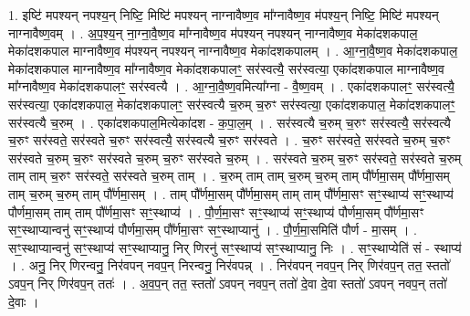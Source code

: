 \documentclass[17pt]{extarticle}
\begin{document}
1. इष्टि॑ मपश्यन् नपश्य॒न् निष्टि॒ मिष्टि॑ मपश्यन् नाग्नावैष्ण॒व मा᳚ग्नावैष्ण॒व म॑पश्य॒न् निष्टि॒ मिष्टि॑ मपश्यन् नाग्नावैष्ण॒वम् । . अ॒प॒श्य॒न् ना॒ग्ना॒वै॒ष्ण॒व मा᳚ग्नावैष्ण॒व म॑पश्यन् नपश्यन् नाग्नावैष्ण॒व मेका॑दशकपाल॒ मेका॑दशकपाल माग्नावैष्ण॒व म॑पश्यन् नपश्यन् नाग्नावैष्ण॒व मेका॑दशकपालम् । . आ॒ग्ना॒वै॒ष्ण॒व मेका॑दशकपाल॒ मेका॑दशकपाल माग्नावैष्ण॒व मा᳚ग्नावैष्ण॒व मेका॑दशकपालꣳ॒॒ सर॑स्वत्यै॒ सर॑स्वत्या॒ एका॑दशकपाल माग्नावैष्ण॒व मा᳚ग्नावैष्ण॒व मेका॑दशकपालꣳ॒॒ सर॑स्वत्यै । . आ॒ग्ना॒वै॒ष्ण॒वमित्या᳚ग्ना - वै॒ष्ण॒वम् । . एका॑दशकपालꣳ॒॒ सर॑स्वत्यै॒ सर॑स्वत्या॒ एका॑दशकपाल॒ मेका॑दशकपालꣳ॒॒ सर॑स्वत्यै च॒रुम् च॒रुꣳ सर॑स्वत्या॒ एका॑दशकपाल॒ मेका॑दशकपालꣳ॒॒ सर॑स्वत्यै च॒रुम् । . एका॑दशकपाल॒मित्येका॑दश - क॒पा॒ल॒म् । . सर॑स्वत्यै च॒रुम् च॒रुꣳ सर॑स्वत्यै॒ सर॑स्वत्यै च॒रुꣳ सर॑स्वते॒ सर॑स्वते च॒रुꣳ सर॑स्वत्यै॒ सर॑स्वत्यै च॒रुꣳ सर॑स्वते । . च॒रुꣳ सर॑स्वते॒ सर॑स्वते च॒रुम् च॒रुꣳ सर॑स्वते च॒रुम् च॒रुꣳ सर॑स्वते च॒रुम् च॒रुꣳ सर॑स्वते च॒रुम् । . सर॑स्वते च॒रुम् च॒रुꣳ सर॑स्वते॒ सर॑स्वते च॒रुम् ताम् ताम् च॒रुꣳ सर॑स्वते॒ सर॑स्वते च॒रुम् ताम् । . च॒रुम् ताम् ताम् च॒रुम् च॒रुम् ताम् पौ᳚र्णमा॒सम् पौ᳚र्णमा॒सम् ताम् च॒रुम् च॒रुम् ताम् पौ᳚र्णमा॒सम् । . ताम् पौ᳚र्णमा॒सम् पौ᳚र्णमा॒सम् ताम् ताम् पौ᳚र्णमा॒सꣳ सꣳ॒॒स्थाप्य॑ सꣳ॒॒स्थाप्य॑ पौर्णमा॒सम् ताम् ताम् पौ᳚र्णमा॒सꣳ सꣳ॒॒स्थाप्य॑ । . पौ॒र्ण॒मा॒सꣳ सꣳ॒॒स्थाप्य॑ सꣳ॒॒स्थाप्य॑ पौर्णमा॒सम् पौ᳚र्णमा॒सꣳ सꣳ॒॒स्थाप्यान्वनु॑ सꣳ॒॒स्थाप्य॑ पौर्णमा॒सम् पौ᳚र्णमा॒सꣳ सꣳ॒॒स्थाप्यानु॑ । . पौ॒र्ण॒मा॒समिति॑ पौर्ण - मा॒सम् । . सꣳ॒॒स्थाप्यान्वनु॑ सꣳ॒॒स्थाप्य॑ सꣳ॒॒स्थाप्यानु॒ निर् णिरनु॑ सꣳ॒॒स्थाप्य॑ सꣳ॒॒स्थाप्यानु॒ निः । . सꣳ॒॒स्थाप्येति॑ सं - स्थाप्य॑ । . अनु॒ निर् णिरन्वनु॒ निर॑वपन् नवप॒न् निरन्वनु॒ निर॑वपन्न् । . निर॑वपन् नवप॒न् निर् णिर॑वप॒न् तत॒ स्ततो॑ ऽवप॒न् निर् णिर॑वप॒न् ततः॑ । . अ॒व॒प॒न् तत॒ स्ततो॑ ऽवपन् नवप॒न् ततो॑ दे॒वा दे॒वा स्ततो॑ ऽवपन् नवप॒न् ततो॑ दे॒वाः । \newline
\end{document}
